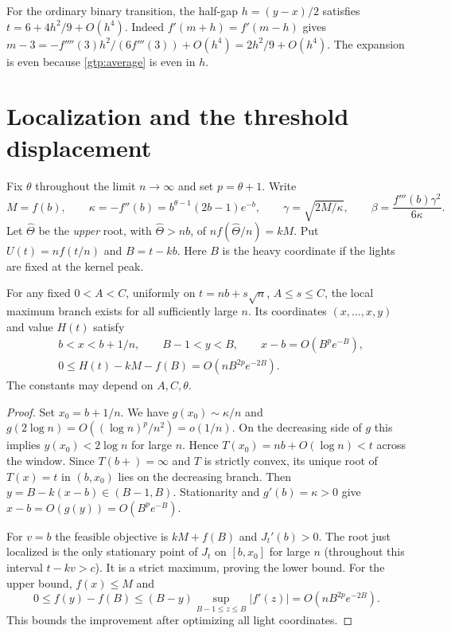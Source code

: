 For the ordinary binary transition, the half-gap $h=(y-x)/2$ satisfies
$t=6+4h^2/9+O(h^4)$. Indeed $f'(m+h)=f'(m-h)$ gives
$m-3=-f''''(3)h^2/(6f'''(3))+O(h^4)=2h^2/9+O(h^4)$.
The expansion is even because \eqref{gtp:average} is even in $h$.

\section{Localization and the threshold displacement}
Fix $\theta$ throughout the limit $n\to\infty$ and set $p=\theta+1$. Write
\[
 M=f(b),\qquad \kappa=-f''(b)=b^{\theta-1}(2b-1)e^{-b},\qquad
 \gamma=\sqrt{2M/\kappa},\qquad \beta=\frac{f'''(b)\gamma^2}{6\kappa}.
\]
Let $\widehat\Theta$ be the \emph{upper} root, with $\widehat\Theta>nb$,
of $n f(\widehat\Theta/n)=kM$. Put $U(t)=n f(t/n)$ and $B=t-kb$.
Here $B$ is the heavy coordinate if the lights are fixed at the kernel peak.

\begin{lemma}\label{gtp:window}
For any fixed $0<A<C$, uniformly on
$t=nb+s\sqrt n$, $A\le s\le C$, the local maximum branch exists for all
sufficiently large $n$. Its coordinates $(x,\ldots,x,y)$ and value $H(t)$
satisfy
\begin{align}
 &b<x<b+1/n,\qquad B-1<y<B,\qquad x-b=O(B^p e^{-B}),\label{gtp:location}\\
 &0\le H(t)-kM-f(B)=O\!\left(n B^{2p}e^{-2B}\right).\label{gtp:opt}
\end{align}
The constants may depend on $A,C,\theta$.
\end{lemma}
\begin{proof}
Set $x_0=b+1/n$. We have $g(x_0)\sim\kappa/n$ and
$g(2\log n)=O((\log n)^p/n^2)=o(1/n)$. On the decreasing side of $g$
this implies $y(x_0)<2\log n$ for large $n$. Hence
$T(x_0)=nb+O(\log n)<t$ across the window. Since $T(b+)=\infty$ and
$T$ is strictly convex, its unique root of $T(x)=t$ in $(b,x_0)$ lies
on the decreasing branch. Then $y=B-k(x-b)\in(B-1,B)$. Stationarity and
$g'(b)=\kappa>0$ give
$x-b=O(g(y))=O(B^p e^{-B})$.

For $v=b$ the feasible objective is $kM+f(B)$ and $J_t'(b)>0$.
The root just localized is the only stationary point of $J_t$ on $[b,x_0]$
for large $n$ (throughout this interval $t-kv>c$). It is a strict
maximum, proving the lower bound. For the upper bound, $f(x)\le M$ and
\[
 0\le f(y)-f(B)\le (B-y)\sup_{B-1\le z\le B}|f'(z)|
        =O(nB^{2p}e^{-2B}).
\]
This bounds the improvement after optimizing all light coordinates.
\end{proof}

